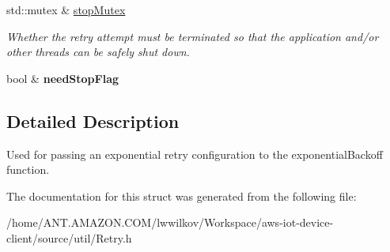 \begin{DoxyCompactItemize}
\mbox{\label{struct_aws_1_1_iot_1_1_device_client_1_1_util_1_1_retry_1_1_exponential_retry_config_aacafcbe39d7a5b5efda96e670aae954e}} 
std\+::mutex \& \hyperlink{struct_aws_1_1_iot_1_1_device_client_1_1_util_1_1_retry_1_1_exponential_retry_config_aacafcbe39d7a5b5efda96e670aae954e}{stop\+Mutex}
\begin{DoxyCompactList}\small\item\em Whether the retry attempt must be terminated so that the application and/or other threads can be safely shut down. \end{DoxyCompactList}\item 
\mbox{\label{struct_aws_1_1_iot_1_1_device_client_1_1_util_1_1_retry_1_1_exponential_retry_config_a9fb6351157e724b7e95bbafa0fb3e3ad}} 
bool \& {\bfseries need\+Stop\+Flag}
\end{DoxyCompactItemize}


\subsection{Detailed Description}
Used for passing an exponential retry configuration to the exponential\+Backoff function. 

The documentation for this struct was generated from the following file\+:\begin{DoxyCompactItemize}
\item 
/home/\+A\+N\+T.\+A\+M\+A\+Z\+O\+N.\+C\+O\+M/lwwilkov/\+Workspace/aws-\/iot-\/device-\/client/source/util/Retry.\+h\end{DoxyCompactItemize}

